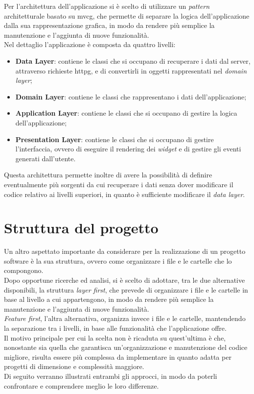 Per l'architettura dell'applicazione si è scelto di utilizzare un \emph{pattern} architetturale basato su \gls{mvcg}\glsoccur\cite{site:app-architecture}, che permette di separare la logica dell'applicazione dalla sua rappresentazione grafica, in modo da rendere più semplice la manutenzione e l'aggiunta di nuove funzionalità.\\
Nel dettaglio l'applicazione è composta da quattro livelli:
\begin{itemize}
    \item \textbf{Data Layer}: contiene le classi che si occupano di recuperare i dati dal server, attraverso richieste \gls{httpg}\glsoccur, e di convertirli in oggetti rappresentati nel \emph{domain layer};
    \item \textbf{Domain Layer}: contiene le classi che rappresentano i dati dell'applicazione;
    \item \textbf{Application Layer}: contiene le classi che si occupano di gestire la logica dell'applicazione;
    \item \textbf{Presentation Layer}: contiene le classi che si occupano di gestire l'interfaccia, ovvero di eseguire il rendering dei \emph{widget} e di gestire gli eventi generati dall'utente.
\end{itemize}
Questa architettura permette inoltre di avere la possibilità di definire eventualmente più sorgenti da cui recuperare i dati senza dover modificare il codice relativo ai livelli superiori, in quanto è sufficiente modificare il \emph{data layer}.

\section{Struttura del progetto}
\label{sec:struttura-progetto}
Un altro aspettato importante da considerare per la realizzazione di un progetto software è la sua struttura, ovvero come organizzare i file e le cartelle che lo compongono.\\
Dopo opportune ricerche ed analisi, si è scelto di adottare, tra le due alternative disponibili, la struttura \emph{layer first}, che prevede di organizzare i file e le cartelle in base al livello a cui appartengono, in modo da rendere più semplice la manutenzione e l'aggiunta di nuove funzionalità.\\
\emph{Feature first}, l'altra alternativa, organizza invece i file e le cartelle, mantendendo la separazione tra i livelli, in base alle funzionalità che l'applicazione offre.\\
Il motivo principale per cui la scelta non è ricaduta su quest'ultima è che, nonostante sia quella che garantisca un'organizzazione e manutenzione del codice migliore, risulta essere più complessa da implementare in quanto adatta per progetti di dimensione e complessità maggiore.\\
Di seguito verranno illustrati entrambi gli approcci, in modo da poterli confrontare e comprendere meglio le loro differenze\cite{site:project-structure}.


